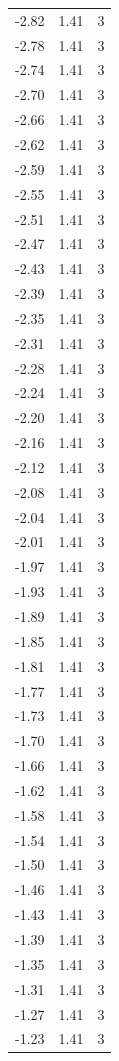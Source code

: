 \begin{longtable}{lrr}
  -2.82 & 1.41 & 3 \\
  -2.78 & 1.41 & 3 \\
  -2.74 & 1.41 & 3 \\
  -2.70 & 1.41 & 3 \\
  -2.66 & 1.41 & 3 \\
  -2.62 & 1.41 & 3 \\
  -2.59 & 1.41 & 3 \\
  -2.55 & 1.41 & 3 \\
  -2.51 & 1.41 & 3 \\
  -2.47 & 1.41 & 3 \\
  -2.43 & 1.41 & 3 \\
  -2.39 & 1.41 & 3 \\
  -2.35 & 1.41 & 3 \\
  -2.31 & 1.41 & 3 \\
  -2.28 & 1.41 & 3 \\
  -2.24 & 1.41 & 3 \\
  -2.20 & 1.41 & 3 \\
  -2.16 & 1.41 & 3 \\
  -2.12 & 1.41 & 3 \\
  -2.08 & 1.41 & 3 \\
  -2.04 & 1.41 & 3 \\
  -2.01 & 1.41 & 3 \\
  -1.97 & 1.41 & 3 \\
  -1.93 & 1.41 & 3 \\
  -1.89 & 1.41 & 3 \\
  -1.85 & 1.41 & 3 \\
  -1.81 & 1.41 & 3 \\
  -1.77 & 1.41 & 3 \\
  -1.73 & 1.41 & 3 \\
  -1.70 & 1.41 & 3 \\
  -1.66 & 1.41 & 3 \\
  -1.62 & 1.41 & 3 \\
  -1.58 & 1.41 & 3 \\
  -1.54 & 1.41 & 3 \\
  -1.50 & 1.41 & 3 \\
  -1.46 & 1.41 & 3 \\
  -1.43 & 1.41 & 3 \\
  -1.39 & 1.41 & 3 \\
  -1.35 & 1.41 & 3 \\
  -1.31 & 1.41 & 3 \\
  -1.27 & 1.41 & 3 \\
  -1.23 & 1.41 & 3 \\

\end{longtable}
